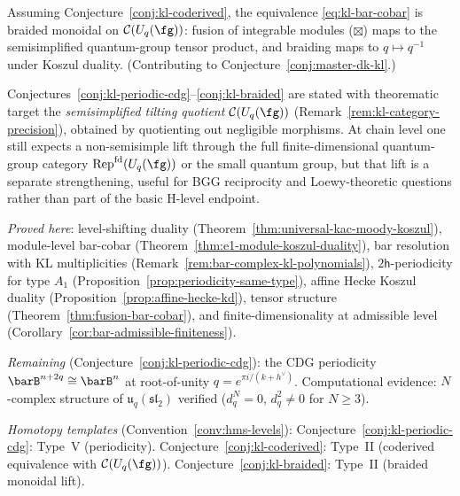 \begin{conjecture}\label{conj:kl-braided}
Assuming Conjecture~\textup{\ref{conj:kl-coderived}}, the equivalence
\eqref{eq:kl-bar-cobar} is braided monoidal on
$\mathcal{C}(U_q(\fg))$: fusion of integrable
modules ($\boxtimes$) maps to the semisimplified quantum-group tensor
product, and braiding maps to
$q \mapsto q^{-1}$ under Koszul duality.
(Contributing to Conjecture~\ref{conj:master-dk-kl}.)
\end{conjecture}

\begin{remark}\label{rem:kl-conjecture-target}
Conjectures~\ref{conj:kl-periodic-cdg}--\ref{conj:kl-braided} are stated
with theorematic target the \emph{semisimplified tilting quotient}
$\mathcal{C}(U_q(\fg))$ (Remark~\ref{rem:kl-category-precision}),
obtained by quotienting out negligible morphisms.
At chain level one still expects a non-semisimple lift through the
full finite-dimensional quantum-group category
$\mathrm{Rep}^{\mathrm{fd}}(U_q(\fg))$ or the small quantum group,
but that lift is a separate strengthening, useful for BGG reciprocity
and Loewy-theoretic questions rather than part of the basic H-level
endpoint.
\end{remark}

\begin{remark}\label{rem:kl-evidence}
\emph{Proved here}: level-shifting duality (Theorem~\ref{thm:universal-kac-moody-koszul}), module-level bar-cobar (Theorem~\ref{thm:e1-module-koszul-duality}), bar resolution with KL multiplicities (Remark~\ref{rem:bar-complex-kl-polynomials}), $2\mathsf{h}$-periodicity for type $A_1$ (Proposition~\ref{prop:periodicity-same-type}), affine Hecke Koszul duality (Proposition~\ref{prop:affine-hecke-kd}), tensor structure (Theorem~\ref{thm:fusion-bar-cobar}), and finite-dimensionality at admissible level (Corollary~\ref{cor:bar-admissible-finiteness}).

\emph{Remaining} (Conjecture~\ref{conj:kl-periodic-cdg}): the CDG periodicity $\barB^{n+2q} \cong \barB^n$ at root-of-unity $q = e^{\pi i/(k+h^\vee)}$.  Computational evidence: $N$-complex structure of $\mathfrak{u}_q(\mathfrak{sl}_2)$ verified ($d_q^N = 0$, $d_q^2 \neq 0$ for $N \geq 3$).

\emph{Homotopy templates} (Convention~\ref{conv:hms-levels}): Conjecture~\ref{conj:kl-periodic-cdg}: Type~V (periodicity).  Conjecture~\ref{conj:kl-coderived}: Type~II (coderived equivalence with $\mathcal{C}(U_q(\fg))$).  Conjecture~\ref{conj:kl-braided}: Type~II (braided monoidal lift).
\end{remark}

